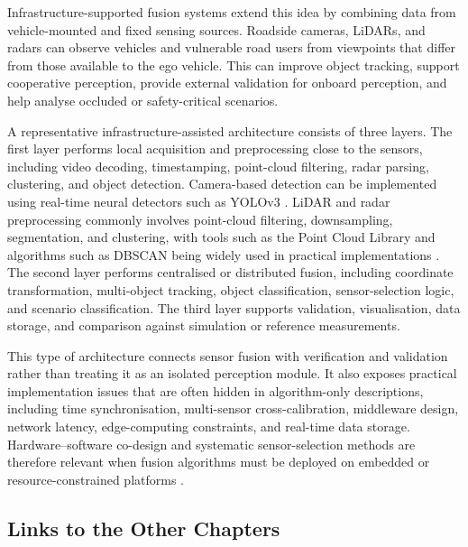 \documentclass[graybox,envcountchap]{style/SNmono}
\begin{document}
Infrastructure-supported fusion systems extend this idea by combining data from vehicle-mounted and fixed sensing sources. Roadside cameras, LiDARs, and radars can observe vehicles and vulnerable road users from viewpoints that differ from those available to the ego vehicle. This can improve object tracking, support cooperative perception, provide external validation for onboard perception, and help analyse occluded or safety-critical scenarios.

A representative infrastructure-assisted architecture consists of three layers. The first layer performs local acquisition and preprocessing close to the sensors, including video decoding, timestamping, point-cloud filtering, radar parsing, clustering, and object detection. Camera-based detection can be implemented using real-time neural detectors such as YOLOv3 \cite{redmon_yolov3_2018}. LiDAR and radar preprocessing commonly involves point-cloud filtering, downsampling, segmentation, and clustering, with tools such as the Point Cloud Library and algorithms such as DBSCAN being widely used in practical implementations \cite{rusu_pcl_2011, ester1996_dbscan}. The second layer performs centralised or distributed fusion, including coordinate transformation, multi-object tracking, object classification, sensor-selection logic, and scenario classification. The third layer supports validation, visualisation, data storage, and comparison against simulation or reference measurements.

This type of architecture connects sensor fusion with verification and validation rather than treating it as an isolated perception module. It also exposes practical implementation issues that are often hidden in algorithm-only descriptions, including time synchronisation, multi-sensor cross-calibration, middleware design, network latency, edge-computing constraints, and real-time data storage. Hardware--software co-design and systematic sensor-selection methods are therefore relevant when fusion algorithms must be deployed on embedded or resource-constrained platforms \cite{deliparaschos2016_jee_fpga}.

\subsection{Links to the Other Chapters}
\label{subsec:ch05-links}
\end{document}
